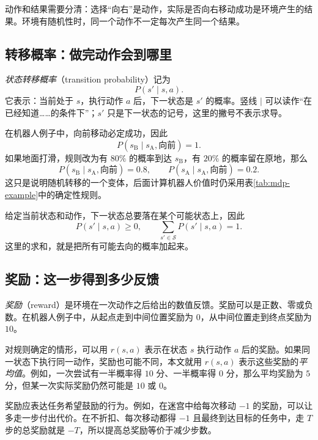 \documentclass[UTF8,12pt,a4paper,fontset=fandol]{ctexart}
\begin{document}
动作和结果需要分清：选择“向右”是动作，实际是否向右移动成功是环境产生的结果。环境有随机性时，同一个动作不一定每次产生同一个结果。

\subsection{转移概率：做完动作会到哪里}

\emph{状态转移概率}（transition probability）记为
\begin{equation}
  P(s'\mid s,a).
  \label{eq:mdp-transition}
\end{equation}
它表示：当前处于 $s$，执行动作 $a$ 后，下一状态是 $s'$ 的概率。竖线 $\mid$ 可以读作“在已经知道……的条件下”；$s'$ 只是下一状态的记号，这里的撇号不表示求导。

在机器人例子中，向前移动必定成功，因此
\[
  P(s_{\mathrm B}\mid s_{\mathrm A},\text{向前})=1.
\]
如果地面打滑，规则改为有 $80\%$ 的概率到达 $s_{\mathrm B}$，有 $20\%$ 的概率留在原地，那么
\[
  P(s_{\mathrm B}\mid s_{\mathrm A},\text{向前})=0.8,
  \qquad
  P(s_{\mathrm A}\mid s_{\mathrm A},\text{向前})=0.2.
\]
这只是说明随机转移的一个变体，后面计算机器人价值时仍采用表\ref{tab:mdp-example}中的确定性规则。

给定当前状态和动作，下一状态总要落在某个可能状态上，因此
\begin{equation}
  P(s'\mid s,a)\geq0,
  \qquad \sum_{s'\in\mathcal S}P(s'\mid s,a)=1.
  \label{eq:mdp-transition-sum}
\end{equation}
这里的求和，就是把所有可能去向的概率加起来。

\subsection{奖励：这一步得到多少反馈}

\emph{奖励}（reward）是环境在一次动作之后给出的数值反馈。奖励可以是正数、零或负数。在机器人例子中，从起点走到中间位置奖励为 $0$，从中间位置走到终点奖励为 $10$。

对规则确定的情形，可以用 $r(s,a)$ 表示在状态 $s$ 执行动作 $a$ 后的奖励。如果同一状态下执行同一动作，奖励也可能不同，本文就用 $r(s,a)$ 表示这些奖励的\emph{平均值}。例如，一次尝试有一半概率得 $10$ 分、一半概率得 $0$ 分，那么平均奖励为 $5$ 分，但某一次实际奖励仍然可能是 $10$ 或 $0$。

奖励应表达任务希望鼓励的行为。例如，在迷宫中给每次移动 $-1$ 的奖励，可以让多走一步付出代价。在不折扣、每次移动都得 $-1$ 且最终到达目标的任务中，走 $T$ 步的总奖励就是 $-T$，所以提高总奖励等价于减少步数。
\end{document}
